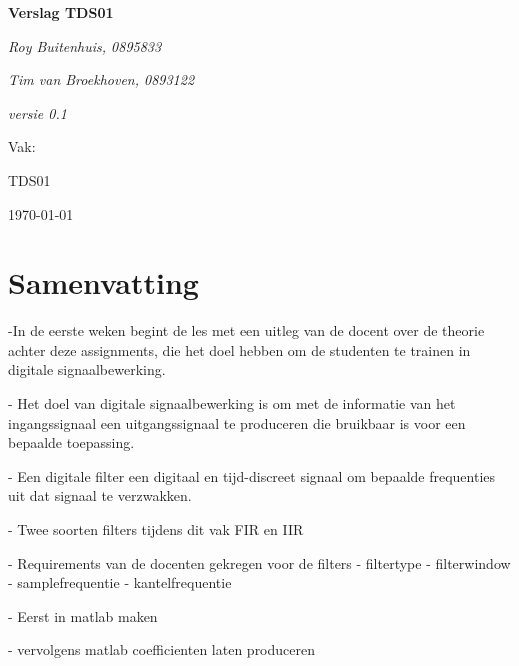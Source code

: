 \documentclass[11pt,a4paper]{article}
\def\auteureen{Roy Buitenhuis, 0895833}
\def\auteurtwee{Tim van Broekhoven, 0893122}
\def\titel{Verslag TDS01}
\def\datum{\today}
\def\versie{0.1}
\begin{document}
	
	\begin{titlepage}
		
		\centering
		{\huge\bfseries \titel \par}
		
		\vspace{1cm}
		{\Large\itshape \auteureen \par}
		{\Large\itshape \auteurtwee \par}
		\vspace{1cm}
		{\Large\itshape versie \versie\par}
				
		\vfill
		Vak:\par
		TDS01
		
		\vfill
		{\large \datum \par}
	\end{titlepage}

	\section{Samenvatting}
	-In de eerste weken begint de les met een uitleg van de docent over de theorie achter deze assignments, die het doel hebben om de studenten te trainen in digitale signaalbewerking.	
	
	- Het doel van digitale signaalbewerking is om met de informatie van het ingangssignaal een uitgangssignaal te produceren die bruikbaar is voor een bepaalde toepassing.
	
	- Een digitale filter een digitaal en tijd-discreet signaal om bepaalde frequenties uit dat signaal te verzwakken.
	
	- Twee soorten filters tijdens dit vak FIR en IIR
	
	- Requirements van de docenten gekregen voor de filters
		- filtertype
		- filterwindow
		- samplefrequentie
		- kantelfrequentie
		
	- Eerst in matlab maken
	
	- vervolgens matlab coefficienten laten produceren
	
		
	
	\clearpage
	
	\tableofcontents
	
	\clearpage
	
	\listoffigures
	
	\clearpage
	\listoftables
	
	\clearpage
	
\end{document}

